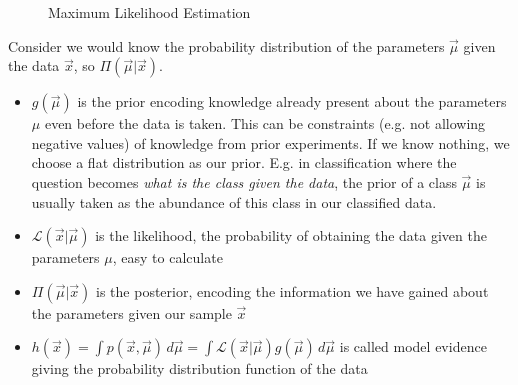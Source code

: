\begin{figure}[!htb]
    \centering
    \hfill
    \caption{Maximum Likelihood Estimation}
    \label{fig:mle_mc}
\end{figure}

Consider we would know the probability distribution of the parameters $\vec{\mu}$
given the data $\vec{x}$, so $\Pi(\vec{\mu}|\vec{x})$.

\begin{itemize}
    \item $g(\vec{\mu})$ is the prior encoding knowledge already present
    about the parameters $\mu$ even before the data is taken. This can be constraints
    (e.g. not allowing negative values) of knowledge from prior experiments. If we know nothing,
    we choose a flat distribution as our prior. E.g. in classification where the question becomes
    \textit{what is the class given the data}, the prior of a class $\vec{\mu}$ is usually
    taken as the abundance of this class in our classified data.
    \item $\mathcal{L}(\vec{x}|\vec{\mu})$ is the likelihood, the probability of obtaining the data given the 
    parameters $\mu$, easy to calculate
    \item $\Pi(\vec{\mu}|\vec{x})$ is the posterior, encoding the information we have gained about the
    parameters given our sample $\vec{x}$
    \item $h(\vec{x}) = \int p(\vec{x},\vec{\mu}) \, d\vec{\mu} = \int \mathcal{L}(\vec{x}|\vec{\mu}) g(\vec{\mu}) \, d\vec{\mu}$ is called model evidence giving the probability distribution function of the data
\end{itemize}

